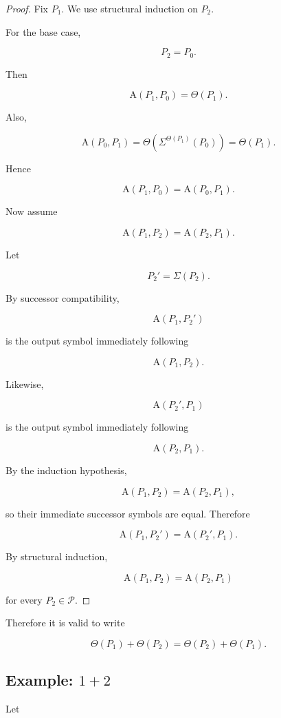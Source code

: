 \documentclass[12pt]{article}
\newcommand{\Alpha}{\mathrm{A}}
\begin{document}
\begin{proof}

Fix \(P_1\). We use structural induction on \(P_2\).

For the base case,

\[
P_2=P_0.
\]

Then

\[
\Alpha(P_1,P_0)=\Theta(P_1).
\]

Also,

\[
\Alpha(P_0,P_1)
=
\Theta\left(\Sigma^{\Theta(P_1)}(P_0)\right)
=
\Theta(P_1).
\]

Hence

\[
\Alpha(P_1,P_0)=\Alpha(P_0,P_1).
\]

Now assume

\[
\Alpha(P_1,P_2)=\Alpha(P_2,P_1).
\]

Let

\[
P_2'=\Sigma(P_2).
\]

By successor compatibility,

\[
\Alpha(P_1,P_2')
\]

is the output symbol immediately following

\[
\Alpha(P_1,P_2).
\]

Likewise,

\[
\Alpha(P_2',P_1)
\]

is the output symbol immediately following

\[
\Alpha(P_2,P_1).
\]

By the induction hypothesis,

\[
\Alpha(P_1,P_2)=\Alpha(P_2,P_1),
\]

so their immediate successor symbols are equal. Therefore

\[
\Alpha(P_1,P_2')=\Alpha(P_2',P_1).
\]

By structural induction,

\[
\Alpha(P_1,P_2)=\Alpha(P_2,P_1)
\]

for every \(P_2\in\mathcal P\).

\end{proof}

Therefore it is valid to write

\[
\boxed{
\Theta(P_1)+\Theta(P_2)
=
\Theta(P_2)+\Theta(P_1).
}
\]

\subsection*{Example: \(1+2\)}

Let
\end{document}
